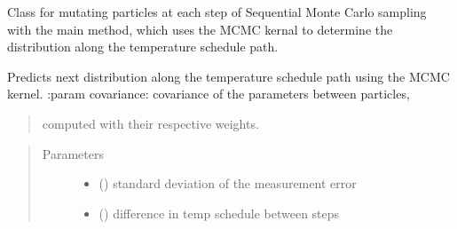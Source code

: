\documentclass[letterpaper,10pt,english]{sphinxmanual}
\begin{document}
\begin{fulllineitems}
\label{\detokenize{source_code:smcpy.smc.particle_mutator.ParticleMutator}}
Class for mutating particles at each step of Sequential Monte Carlo sampling
with the main  method, which uses the MCMC kernal to
determine the distribution along the temperature schedule path.

\begin{fulllineitems}
\label{\detokenize{source_code:smcpy.smc.particle_mutator.ParticleMutator.mutate_new_particles}}
Predicts next distribution along the temperature schedule path using
the MCMC kernel.
:param covariance: covariance of the parameters between particles,
\begin{quote}

computed with their respective weights.
\end{quote}
\begin{quote}\begin{description}
\item[{Parameters}] \leavevmode\begin{itemize}
\item {} 
 () \textendash{} standard deviation of the measurement error

\item {} 
 () \textendash{} difference in temp schedule between steps

\end{itemize}

\end{description}\end{quote}

\end{fulllineitems}


\end{fulllineitems}
\end{document}
